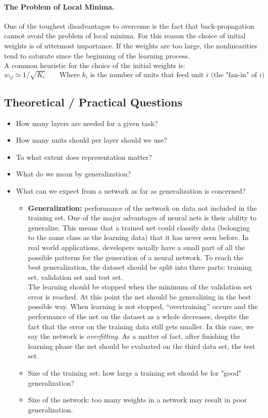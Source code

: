 \paragraph*{The Problem of Local Minima.} One of the toughest disadvantages to overcome is the fact that back-propagation cannot avoid the problem of local minima. For this reason the choice of initial weights is of uttermost importance. If the weights are too large, the nonlinearities tend to saturate since the beginning of the learning process. \\
A common heuristic for the choice of the initial weights is: 
$$w_{ij} \simeq 1/\sqrt{K_i} \qquad \text{Where } k_i \text{ is the number of units that feed unit }i \text{ (the "fan-in" of }i \text{)}$$

\subsection{Theoretical / Practical Questions}
\begin{itemize}
	\item How many layers are needed for a given task?
	\item How many units should per layer should we use?
	\item To what extent does representation matter?
	\item What do we mean by generalization?
	\item What can we expect from a network as far as generalization is concerned?
	\begin{itemize}
		\item \textbf{Generalization:} performance of the network on data not included in the training set. One of the major advantages of neural nets is their ability to generalize. This means that a trained net could classify data (belonging to the same class as the learning data) that it has never seen before. In real world applications, developers usually have a small part of all the possible patterns for the generation of a neural network. To reach the best generalization, the dataset should be split into three parts: training set, validation set and test set.\\
		The learning should be stopped when the minimum of the validation set error is reached. At this point the net should be generalizing in the best possible way. When learning is not stopped, ``overtraining'' occurs and the performance of the net on the dataset as a whole decreases, despite the fact that the error on the training data still gets smaller. In this case, we say the network is \textit{overfitting}. As a matter of fact, after finishing the learning phase the net should be evaluated on the third data set, the test set.
		\item Size of the training set: how large a training set should be for "good" generalization?
		\item Size of the network: too many weights in a network may result in poor generalization.
	\end{itemize}
\end{itemize}


